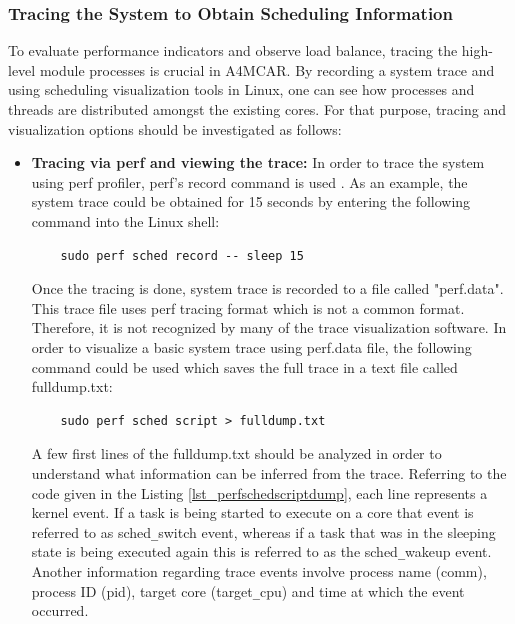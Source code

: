 \subsubsection{Tracing the System to Obtain Scheduling Information}
To evaluate performance indicators and observe load balance, tracing the high-level module processes is crucial in A4MCAR. By recording a system trace and using scheduling visualization tools in Linux, one can see how processes and threads are distributed amongst the existing cores. For that purpose, tracing and visualization options should be investigated as follows:
\begin{itemize}
	\item \textbf{Tracing via perf and viewing the trace:}
	In order to trace the system using perf profiler, perf's record command is used \cite{perf2}. As an example, the system trace could be obtained for 15 seconds by entering the following command into the Linux shell:
	\begin{lstlisting}
	sudo perf sched record -- sleep 15
	\end{lstlisting}
	Once the tracing is done, system trace is recorded to a file called "perf.data". This trace file uses perf tracing format which is not a common format. Therefore, it is not recognized by many of the trace visualization software. In order to visualize a basic system trace using perf.data file, the following command could be used which saves the full trace in a text file called fulldump.txt:
	\begin{lstlisting}
	sudo perf sched script > fulldump.txt
	\end{lstlisting}
	A few first lines of the fulldump.txt should be analyzed in order to understand what information can be inferred from the trace. Referring to the code given in the Listing \ref{lst_perfschedscriptdump}, each line represents a kernel event. If a task is being started to execute on a core that event is referred to as sched\texttt{\_}switch event, whereas if a task that was in the sleeping state is being executed again this is referred to as the sched\texttt{\_}wakeup event. Another information regarding trace events involve process name (comm), process ID (pid), target core (target\texttt{\_}cpu) and time at which the event occurred. 
	
	\newpage
	
	

\end{itemize}
